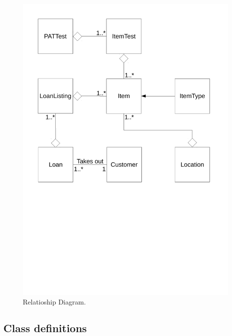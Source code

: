 \begin{figure}[H]
    \includegraphics[width=\textwidth]{./Analysis/Relationship_Diagrams/Relationships_diagrams.pdf}
    \caption{Relatioship Diagram.} \label{fig:relationship_diadram}
\end{figure}

\newpage

\subsection{Class definitions}


